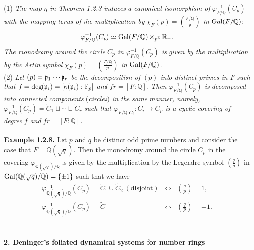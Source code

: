 \documentclass[12pt, leqno]{article}
\begin{document}
(1) {\it The map $\eta$ in Theorem 1.2.3 induces a canonical isomorphism of $\varphi_{F/\mathbb{Q}}^{-1}(C_p)$ with the mapping torus of the multiplication by $\displaystyle{\chi_F(p) = \left(  \frac{F/\mathbb{Q}}{p} \right)}$ in ${\rm Gal}(F/\mathbb{Q})$}:
$$\varphi_{F/\mathbb{Q}}^{-1} (C_p)  \simeq  {\rm Gal}(F/\mathbb{Q}) \times_{p^{\mathbb{Z}}} \mathbb{R}_+.$$
{\it The monodromy around the circle  $C_p$ in $\varphi_{F/\mathbb{Q}}^{-1}(C_p)$  is given by the multiplication by the Artin symbol $\displaystyle{\chi_F(p) = \left(  \frac{F/\mathbb{Q}}{p} \right)}$ in ${\rm Gal}(F/\mathbb{Q})$. }\\
(2) {\it Let $(p) = \frak{p}_1 \cdots \frak{p}_r$ be the decomposition of $(p)$ into distinct primes in $F$ such that $f = {\rm deg}(\frak{p}_i) = [\kappa(\frak{p}_i) : \mathbb{F}_p]$ and $fr = [F:\mathbb{Q}]$. Then $\varphi_{F/\mathbb{Q}}^{-1}(C_p)$ is decomposed into connected components $($circles$)$ in the same manner, namely, 
$\varphi_{F/\mathbb{Q}}^{-1}(C_p) = \tilde{C}_1 \sqcup \cdots \sqcup \tilde{C}_r$
 such that $\varphi_{F/\mathbb{Q}}|_{\tilde{C}_i} : \tilde{C}_i \rightarrow C_p$ is a cyclic covering of degree $f$ and $fr = [F:\mathbb{Q}]$.} \\
\\
{\bf Example 1.2.8.} Let $p$ and $q$ be distinct odd prime numbers and consider the case that $F = \mathbb{Q}(\sqrt{q})$. Then the monodromy around the circle
$C_p$ in the covering $\varphi_{\mathbb{Q}(\sqrt{q})/\mathbb{Q}}$ is given by the multiplication by the Legendre symbol $\displaystyle{\left( \frac{q}{p} \right)}$ in ${\rm Gal}(\mathbb{Q}(\sqrt{q})/\mathbb{Q}) = \{ \pm 1 \}$ such that we have
$$ \begin{array}{ccc}
\varphi_{\mathbb{Q}(\sqrt{q})/\mathbb{Q}}^{-1}(C_p) = \tilde{C}_1 \cup \tilde{C}_2  \; (\mbox{disjoint}) & \Longleftrightarrow & \displaystyle{\left( \frac{q}{p} \right)}= 1,\\
\varphi_{\mathbb{Q}(\sqrt{q})/\mathbb{Q}}^{-1}(C_p) = \tilde{C}   & \Longleftrightarrow & \displaystyle{\left( \frac{q}{p} \right)} = -1.\\
\end{array}
$$
\\

\begin{center}
{\bf 2.  Deninger's foliated dynamical systems for number rings}
\end{center}
\end{document}
